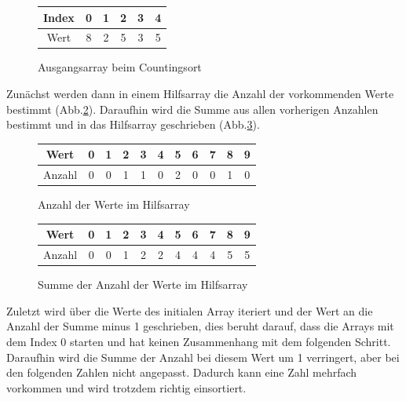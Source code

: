 \documentclass[intern,palatino]{cgBA}
\begin{document}
\begin{figure}[H]
	\centering
	\begin{tabular}{ | c || c | c | c | c | c |}
		\hline
		Index 				&  0 & 1 & 2 & 3 & 4 \\ \hline
		Wert				&  8 & 2 & 5 & 3 & 5 \\
		\hline
	\end{tabular}
	\caption{Ausgangsarray beim Countingsort}
	\label{tab:Counting1}
\end{figure}

Zunächst werden dann in einem Hilfsarray die Anzahl der vorkommenden Werte bestimmt (Abb.\ref{tab:Counting2}). Daraufhin wird die Summe aus allen vorherigen Anzahlen bestimmt und in das Hilfsarray geschrieben (Abb.\ref{tab:Counting3}).
\newline

\begin{figure}[H]
	\centering
	\begin{tabular}{ | c || c | c | c | c | c | c | c | c | c | c |}
		\hline
		Wert 				& 0	&  1 & 2 & 3 & 4 & 5 & 6 & 7 & 8 & 9	\\ \hline
		Anzahl				& 0 &  0 & 1 & 1 & 0 & 2 & 0 & 0 & 1 & 0	\\
		\hline
	\end{tabular}
	\caption{Anzahl der Werte im Hilfsarray}
	\label{tab:Counting2}
\end{figure}

\begin{figure}[H]
	\centering
	\begin{tabular}{ | c || c | c | c | c | c | c | c | c | c | c |}
		\hline
		Wert 				& 0	&  1 & 2 & 3 & 4 & 5 & 6 & 7 & 8 & 9	\\ \hline
		Anzahl				& 0 &  0 & 1 & 2 & 2 & 4 & 4 & 4 & 5 & 5	\\
		\hline
	\end{tabular}
	\caption{Summe der Anzahl der Werte im Hilfsarray}
	\label{tab:Counting3}
\end{figure}

Zuletzt wird über die Werte des initialen Array iteriert und der Wert an die Anzahl der Summe minus 1 geschrieben, dies beruht darauf, dass die Arrays mit dem Index 0 starten und hat keinen Zusammenhang mit dem folgenden Schritt. Daraufhin wird die Summe der Anzahl bei diesem Wert um 1 verringert, aber bei den folgenden Zahlen nicht angepasst. Dadurch kann eine Zahl mehrfach vorkommen und wird trotzdem richtig einsortiert.
\newline
\end{document}
